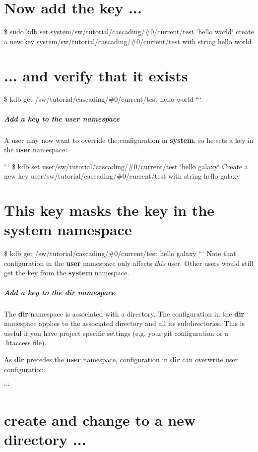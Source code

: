 \section*{Now add the key ...}

\$ sudo kdb set system/sw/tutorial/cascading/\#0/current/test \char`\"{}hello world\char`\"{} create a new key system/sw/tutorial/cascading/\#0/current/test with string hello world

\section*{... and verify that it exists}

\$ kdb get /sw/tutorial/cascading/\#0/current/test hello world ```

\subparagraph*{Add a key to the user namespace}

A user may now want to override the configuration in {\bfseries system}, so he sets a key in the {\bfseries user} namespace\+:

``` \$ kdb set user/sw/tutorial/cascading/\#0/current/test \char`\"{}hello galaxy\char`\"{} Create a new key user/sw/tutorial/cascading/\#0/current/test with string hello galaxy

\section*{This key masks the key in the system namespace}

\$ kdb get /sw/tutorial/cascading/\#0/current/test hello galaxy ``` Note that configuration in the {\bfseries user} namespace only affects {\itshape this} user. Other users would still get the key from the {\bfseries system} namespace.

\subparagraph*{Add a key to the dir namespace}

The {\bfseries dir} namespace is associated with a directory. The configuration in the {\bfseries dir} namespace applies to the associated directory and all its subdirectories. This is useful if you have project specific settings (e.\+g. your git configuration or a .htaccess file).

As {\bfseries dir} precedes the {\bfseries user} namespace, configuration in {\bfseries dir} can overwrite user configuration\+:

``` \section*{create and change to a new directory ...}

